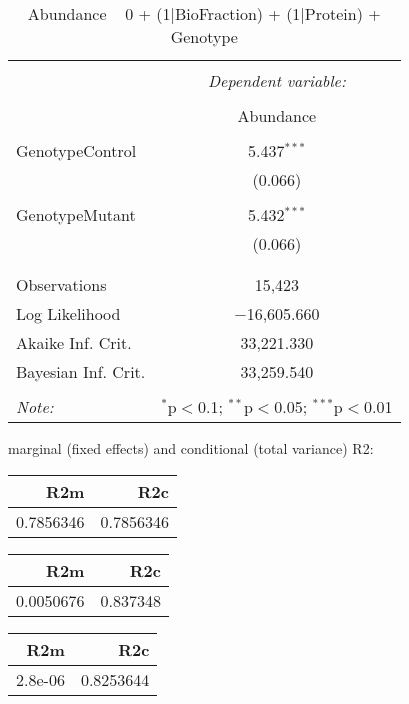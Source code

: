 \documentclass[11pt]{report}
\begin{document}
\begin{table}[!htbp] \centering 
  \caption{Abundance ~ 0 + (1|BioFraction) + (1|Protein) + Genotype} 
  \label{} 
\begin{tabular}{@{\extracolsep{5pt}}lc} 
\\[-1.8ex]\hline 
\hline \\[-1.8ex] 
 & \multicolumn{1}{c}{\textit{Dependent variable:}} \\ 
\cline{2-2} 
\\[-1.8ex] & Abundance \\ 
\hline \\[-1.8ex] 
 GenotypeControl & 5.437$^{***}$ \\ 
  & (0.066) \\ 
  & \\ 
 GenotypeMutant & 5.432$^{***}$ \\ 
  & (0.066) \\ 
  & \\ 
\hline \\[-1.8ex] 
Observations & 15,423 \\ 
Log Likelihood & $-$16,605.660 \\ 
Akaike Inf. Crit. & 33,221.330 \\ 
Bayesian Inf. Crit. & 33,259.540 \\ 
\hline 
\hline \\[-1.8ex] 
\textit{Note:}  & \multicolumn{1}{r}{$^{*}$p$<$0.1; $^{**}$p$<$0.05; $^{***}$p$<$0.01} \\ 
\end{tabular} 
\end{table} 
marginal (fixed effects) and conditional (total variance) R2:

\begin{tabular}{r|r}
\hline
R2m & R2c\\
\hline
0.7856346 & 0.7856346\\
\hline
\end{tabular}

\begin{tabular}{r|r}
\hline
R2m & R2c\\
\hline
0.0050676 & 0.837348\\
\hline
\end{tabular}

\begin{tabular}{r|r}
\hline
R2m & R2c\\
\hline
2.8e-06 & 0.8253644\\
\hline
\end{tabular}
\end{document}
